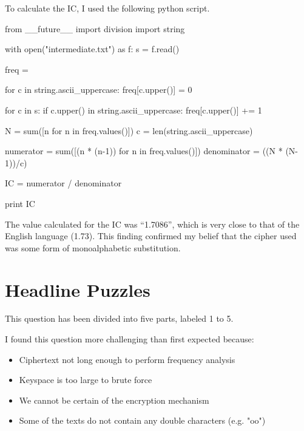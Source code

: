 \documentclass[12pt,a4paper,twoside]{article}
\begin{document}
To calculate the IC, I used the following python script. 
\begin{python}
from __future__ import division
import string

with open("intermediate.txt") as f: 
    s = f.read()

    freq = {}

    for c in string.ascii_uppercase:
        freq[c.upper()] = 0

    for c in s:
        if c.upper() in string.ascii_uppercase:
            freq[c.upper()] += 1
                           
    N = sum([n for n in freq.values()])
    c = len(string.ascii_uppercase)

    numerator = sum([(n * (n-1)) for n in freq.values()]) 
    denominator = ((N * (N-1))/c)

    IC = numerator / denominator 

    print IC
\end{python}

The value calculated for the IC was ``1.7086'', which is very close to that of
the English language (1.73). This finding confirmed my belief that the cipher
used was some form of monoalphabetic substitution.  

\section{Headline Puzzles}
This question has been divided into five parts, labeled 1 to 5.

I found this question more challenging than first expected because:
\begin{itemize}
\item Ciphertext not long enough to perform frequency analysis
\item Keyspace is too large to brute force
\item We cannot be certain of the encryption mechanism
\item Some of the texts do not contain any double characters (e.g. "oo")
\end{itemize}


%
%
%



\end{document}
